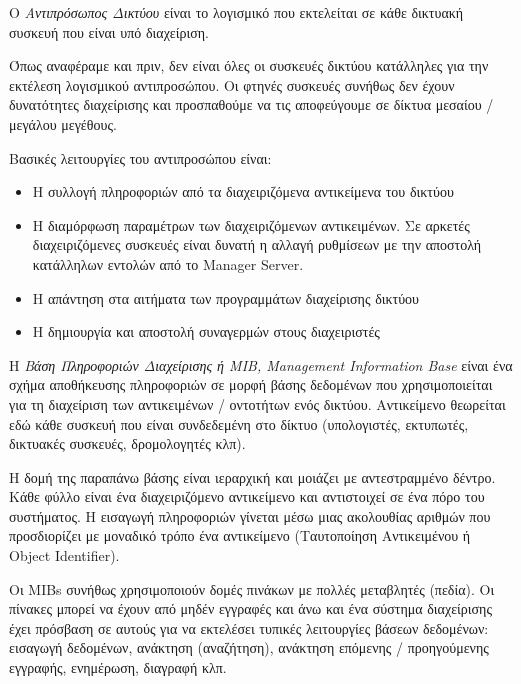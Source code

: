 \begin{inthebox}
Ο \emph{Αντιπρόσωπος Δικτύου} είναι το λογισμικό που εκτελείται σε κάθε δικτυακή συσκευή που είναι υπό διαχείριση.\\
\end{inthebox}

Όπως αναφέραμε και πριν, δεν είναι όλες οι συσκευές δικτύου κατάλληλες για την εκτέλεση λογισμικού αντιπροσώπου. Οι φτηνές συσκευές συνήθως δεν έχουν δυνατότητες διαχείρισης και προσπαθούμε να τις αποφεύγουμε σε δίκτυα μεσαίου / μεγάλου μεγέθους. 

Βασικές λειτουργίες του αντιπροσώπου είναι:

\begin{itemize}
\item Η συλλογή πληροφοριών από τα διαχειριζόμενα αντικείμενα του δικτύου
\item Η διαμόρφωση παραμέτρων των διαχειριζόμενων αντικειμένων. Σε αρκετές διαχειριζόμενες συσκευές είναι δυνατή η αλλαγή ρυθμίσεων με την αποστολή κατάλληλων εντολών από το Manager Server.
\item Η απάντηση στα αιτήματα των προγραμμάτων διαχείρισης δικτύου
\item Η δημιουργία και αποστολή συναγερμών στους διαχειριστές
\end{itemize}

\begin{inthebox}
Η \emph{Βάση Πληροφοριών Διαχείρισης ή MIB, Management Information Base} είναι ένα σχήμα αποθήκευσης πληροφοριών σε μορφή βάσης δεδομένων που χρησιμοποιείται για τη διαχείριση των αντικειμένων / οντοτήτων ενός δικτύου. Αντικείμενο θεωρείται εδώ κάθε συσκευή που είναι συνδεδεμένη στο δίκτυο (υπολογιστές, εκτυπωτές, δικτυακές συσκευές, δρομολογητές κλπ).\\
\end{inthebox}

Η δομή της παραπάνω βάσης είναι ιεραρχική και μοιάζει με αντεστραμμένο δέντρο. Κάθε φύλλο είναι ένα διαχειριζόμενο αντικείμενο και αντιστοιχεί σε ένα πόρο του συστήματος. Η εισαγωγή πληροφοριών γίνεται μέσω μιας ακολουθίας αριθμών που προσδιορίζει με μοναδικό τρόπο ένα αντικείμενο (Ταυτοποίηση Αντικειμένου ή Object Identifier).

Οι MIBs συνήθως χρησιμοποιούν δομές πινάκων με πολλές μεταβλητές (πεδία). Οι πίνακες μπορεί να έχουν από μηδέν εγγραφές και άνω και ένα σύστημα διαχείρισης έχει πρόσβαση σε αυτούς για να εκτελέσει τυπικές λειτουργίες βάσεων δεδομένων: εισαγωγή δεδομένων, ανάκτηση (αναζήτηση), ανάκτηση επόμενης / προηγούμενης εγγραφής, ενημέρωση, διαγραφή κλπ.